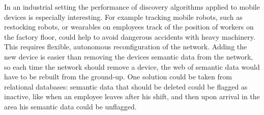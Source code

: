 In an industrial setting the performance of discovery algorithms applied to mobile devices is especially interesting. For example tracking mobile robots, such as restocking robots, or wearables on employees track of the position of workers on the factory floor, could help to avoid dangerous accidents with heavy machinery. This requires flexible, autonomous reconfiguration of the network. Adding the new device is easier than removing the devices semantic data from the network, so each time the network should remove a device, the web of semantic data would have to be rebuilt from the ground-up. One solution could be taken from relational databases: semantic data that should be deleted could be flagged as inactive, like when an employee leaves after his shift, and then upon arrival in the area his semantic data could be unflagged.
